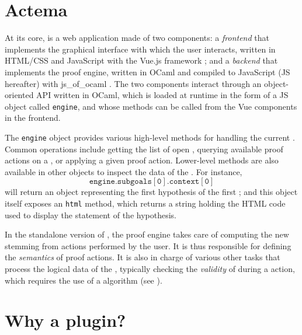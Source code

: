 \section{Actema}

At its core,  is a web application made of two components: a
\emph{frontend} that implements the graphical interface with which the user
interacts, written in HTML/CSS and JavaScript with the Vue.js framework
; and a \emph{backend} that implements the proof engine, written in
OCaml and compiled to JavaScript (JS hereafter) with js\_of\_ocaml
. The two components interact through an
object-oriented API written in OCaml, which is loaded at runtime in the form of
a JS object called \texttt{engine}, and whose methods can be called from the Vue
components in the frontend.

The \texttt{engine} object provides various high-level methods for handling the
current \emph{}. Common operations include getting the list of open
, querying available proof actions on a , or applying a given
proof action. Lower-level methods are also available in other objects to inspect
the data of the . For instance,
$$\mathtt{engine.subgoals[0].context[0]}$$
will return an object representing the first hypothesis of the first ;
and this object itself exposes an \texttt{html} method, which returns a string
holding the HTML code used to display the statement of the hypothesis.


In the standalone version of , the proof engine takes care of computing
the new  stemming from actions performed by the user. It is thus
responsible for defining the \emph{semantics} of proof actions. It is also in
charge of various other tasks that process the logical data of the ,
typically checking the \emph{validity} of  during a  action, which
requires the use of a  algorithm (see ).

\section{Why a plugin?}

